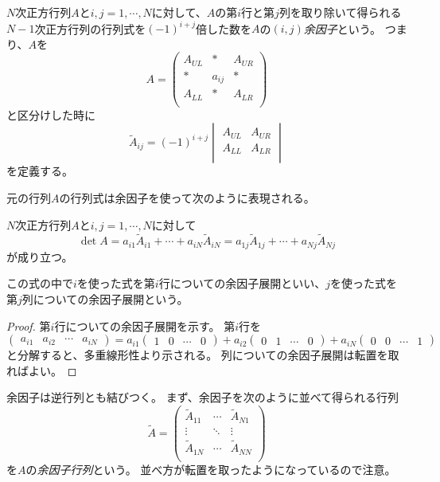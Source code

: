 $N$次正方行列$A$と$i, j = 1, \cdots, N$に対して、$A$の第$i$行と第$j$列を取り除いて得られる$N-1$次正方行列の行列式を$(-1)^{i+j}$倍した数を$A$の$(i, j)$\emph{余因子}という。
つまり、$A$を
$$
A =
\begin{pmatrix}
A_{U L} & * & A_{U R}\\
* & a_{i j} & * \\
A_{L L} & * & A_{L R}\\
\end{pmatrix}
$$
と区分けした時に
$$
\tilde{A}_{i j} =
(-1)^{i+j}
\begin{vmatrix}
A_{U L} & A_{U R}\\
A_{L L} & A_{L R}\\
\end{vmatrix}
$$
を定義する。

元の行列$A$の行列式は余因子を使って次のように表現される。

\begin{theorem}[余因子展開]
$N$次正方行列$A$と$i, j = 1, \cdots, N$に対して
$$
\det A
= a_{i 1}\tilde{A}_{i 1}+\cdots+a_{i N}\tilde{A}_{i N}
= a_{1 j}\tilde{A}_{1 j}+\cdots+a_{N j}\tilde{A}_{N j}
$$
が成り立つ。
\end{theorem}

この式の中で$i$を使った式を第$i$行についての余因子展開といい、$j$を使った式を第$j$列についての余因子展開という。

\begin{proof}
第$i$行についての余因子展開を示す。
第$i$行を
$$
\begin{pmatrix}a_{i 1} & a_{i 2} & \cdots & a_{i N}\end{pmatrix}
= a_{i 1}\begin{pmatrix}1 & 0 & \cdots & 0\end{pmatrix}+a_{i 2}\begin{pmatrix}0 & 1 & \cdots & 0\end{pmatrix}+a_{i N}\begin{pmatrix}0 & 0 & \cdots & 1\end{pmatrix}
$$
と分解すると、多重線形性より示される。
列についての余因子展開は転置を取ればよい。
\end{proof}

\begin{example}
\end{example}

\begin{remark}
\end{remark}

余因子は逆行列とも結びつく。
まず、余因子を次のように並べて得られる行列
$$
\tilde{A} =
\begin{pmatrix}
\tilde{A}_{1 1} & \cdots & \tilde{A}_{N 1} \\
\vdots & \ddots & \vdots \\
\tilde{A}_{1 N} & \cdots & \tilde{A}_{N N} \\
\end{pmatrix}
$$
を$A$の\emph{余因子行列}という。
並べ方が転置を取ったようになっているので注意。

